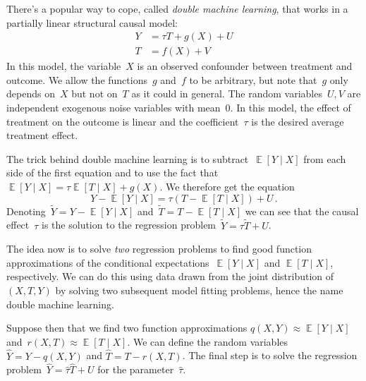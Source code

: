 \documentclass{tufte-book}
\begin{document}
There's a popular way to cope, called \emph{double machine learning},
that works in a partially linear structural causal
model:
\[
\begin{aligned}
Y &= \tau T + g(X) + U \\
T &= f(X) + V
\end{aligned}
\] In this model, the variable~\(X\) is an observed confounder between
treatment and outcome. We allow the functions~\(g\) and~\(f\) to be
arbitrary, but note that~\(g\) only depends on~\(X\) but not on~\(T\) as
it could in general. The random variables~\(U, V\) are independent
exogenous noise variables with mean~\(0\). In this model, the effect of
treatment on the outcome is linear and the coefficient~\(\tau\) is the
desired average treatment effect.

The trick behind double machine learning is to
subtract~\(\mathop\mathbb{E}[Y\mid X]\) from each side of the first
equation and to use the fact that
\(\mathop\mathbb{E}[Y\mid X]=\tau\mathop\mathbb{E}[T\mid X] + g(X)\). We
therefore get the equation \[
Y-\mathop\mathbb{E}[Y\mid X] = \tau (T-\mathop\mathbb{E}[T\mid X]) + U\,.
\] Denoting~\(\tilde Y = Y-\mathop\mathbb{E}[Y\mid X]\)
and~\(\tilde T=T-\mathop\mathbb{E}[T\mid X]\) we can see that the causal
effect~\(\tau\) is the solution to the regression
problem~\(\tilde Y = \tau \tilde T+U\).

The idea now is to solve \emph{two} regression problems to find good
function approximations of the conditional
expectations~\(\mathop\mathbb{E}[Y\mid X]\) and
\(\mathop\mathbb{E}[T\mid X]\), respectively. We can do this using data
drawn from the joint distribution of~\((X, T, Y)\) by solving two
subsequent model fitting problems, hence the name double machine
learning.

Suppose then that we find two function approximations
\(q(X, Y) \approx \mathop\mathbb{E}[Y\mid X]\)
and~\(r(X, T)\approx\mathop\mathbb{E}[T\mid X]\). We can define the
random variables~\(\hat Y = Y - q(X, Y)\) and \(\hat T = T - r(X, T)\).
The final step is to solve the regression
problem~\(\hat Y = \hat\tau\hat T + U\) for the parameter~\(\hat\tau\).
\end{document}
